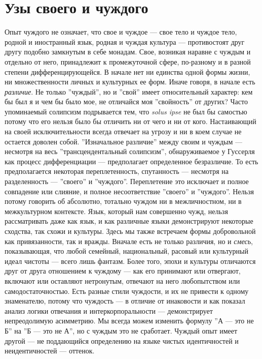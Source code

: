 \documentclass[12pt]{book}
\begin{document}
\section{Узы своего и чуждого}

Опыт чуждого не означает, что свое и чуждое --- свое тело и чуждое тело, родной и иностранный язык, родная и чуждая культура --- противостоят друг другу подобно замкнутым в себе монадам. Свое, возникая наравне с чуждым и отдельно от него, принадлежит к промежуточной сфере, по-разному и в разной степени дифференцирующейся. В начале нет ни единства одной формы жизни, ни множественности личных и культурных ее форм. Иначе говоря, в начале есть \textit{различие}. Не только ''чуждый'', но и ''свой'' имеет относительный характер: кем бы был я и чем бы было мое, не отличайся моя ''свойность'' от других? Часто упоминаемый солипсизм подрывается тем, что \textit{solus ipse} не был бы самостью потому что его нельзя было бы отличить ни от чего и ни от кого.  Настаивающий на своей исключительности всегда отвечает на угрозу и ни в коем случае не остается доволен собой. ''Изначальное различие'' между своим и чуждым --- несмотря на весь ''трансцендентальный солипсизм'', обнаруживаемое у Гуссерля как процесс дифференциации --- предполагает определенное безразличие. То есть предполагается некоторая переплетенность, спутанность --- несмотря на разделенность --- ''своего'' и ''чуждого''. Переплетение это исключает и полное совпадение или слияние, и полное несоответствие ''своего'' и ''чуждого''. Нельзя потому говорить об абсолютно, тотально чуждом ни в межличностном, ни в межкультурном контексте. Язык, который нам совершенно чужд, нельзя рассматривать даже как язык, и как различные языки демонстрируют некоторые сходства, так схожи и культуры. Здесь мы также встречаем формы добровольной как привязанности, так и вражды. Вначале есть не только различия, но и \textit{смесь}, показывающая, что любой семейный, национальный, расовый или культурный идеал чистоты --- всего лишь фантазм. Более того, эпохи и культуры отличаются друг от друга отношением к чуждому --- как его принимают или отвергают, включают или оставляют нетронутым, отвечают на него любопытством или самодостаточностью. Есть разные стили чуждости, и их не привести к одному знаменателю, потому что чуждость --- в отличие от инаковости и как показал анализ логики отвечания и интеркорпоральности --- демонстрирует непреодолимую асимметрию. Мы всегда можем изменить формулу ''А --- это не Б'' на ''Б --- это не А'', но с чуждым это не сработает. Чуждый опыт имеет другой --- не поддающийся определению на языке чистых идентичностей и неидентичностей --- оттенок.
\end{document}
